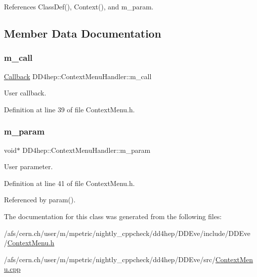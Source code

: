 References Class\+Def(), Context(), and m\+\_\+param.



\subsection{Member Data Documentation}
\hypertarget{class_d_d4hep_1_1_context_menu_handler_a28f1c56b0623ef052bb8647004acc5a7}{}\label{class_d_d4hep_1_1_context_menu_handler_a28f1c56b0623ef052bb8647004acc5a7} 
\subsubsection{\texorpdfstring{m\+\_\+call}{m\_call}}
{\footnotesize\ttfamily \hyperlink{class_d_d4hep_1_1_callback}{Callback} D\+D4hep\+::\+Context\+Menu\+Handler\+::m\+\_\+call\hspace{0.3cm}{\ttfamily [protected]}}



User callback. 



Definition at line 39 of file Context\+Menu.\+h.

\hypertarget{class_d_d4hep_1_1_context_menu_handler_a87e20729498769077b9fb5a668fdf410}{}\label{class_d_d4hep_1_1_context_menu_handler_a87e20729498769077b9fb5a668fdf410} 
\subsubsection{\texorpdfstring{m\+\_\+param}{m\_param}}
{\footnotesize\ttfamily void$\ast$ D\+D4hep\+::\+Context\+Menu\+Handler\+::m\+\_\+param\hspace{0.3cm}{\ttfamily [protected]}}



User parameter. 



Definition at line 41 of file Context\+Menu.\+h.



Referenced by param().



The documentation for this class was generated from the following files\+:\begin{DoxyCompactItemize}
\item 
/afs/cern.\+ch/user/m/mpetric/nightly\+\_\+cppcheck/dd4hep/\+D\+D\+Eve/include/\+D\+D\+Eve/\hyperlink{_context_menu_8h}{Context\+Menu.\+h}\item 
/afs/cern.\+ch/user/m/mpetric/nightly\+\_\+cppcheck/dd4hep/\+D\+D\+Eve/src/\hyperlink{_context_menu_8cpp}{Context\+Menu.\+cpp}\end{DoxyCompactItemize}

